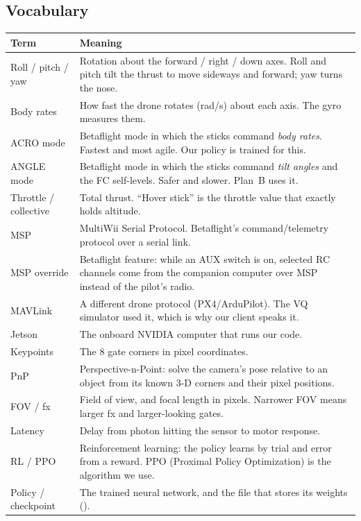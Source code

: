 \documentclass[10pt,a4paper]{article}
\newcommand{\code}[1]{\texttt{\detokenize{#1}}}
\begin{document}
\subsection{Vocabulary}
\begin{longtable}{@{}p{3.3cm}p{12.3cm}@{}}
\toprule
Term & Meaning \\
\midrule\endhead
Roll / pitch / yaw & Rotation about the forward / right / down axes. Roll and pitch tilt the thrust to move sideways and forward; yaw turns the nose. \\
Body rates & How fast the drone rotates (rad/s) about each axis. The gyro measures them. \\
ACRO mode & Betaflight mode in which the sticks command \emph{body rates}. Fastest and most agile. Our policy is trained for this. \\
ANGLE mode & Betaflight mode in which the sticks command \emph{tilt angles} and the FC self-levels. Safer and slower. Plan~B uses it. \\
Throttle / collective & Total thrust. ``Hover stick'' is the throttle value that exactly holds altitude. \\
MSP & MultiWii Serial Protocol. Betaflight's command/telemetry protocol over a serial link. \\
MSP override & Betaflight feature: while an AUX switch is on, selected RC channels come from the companion computer over MSP instead of the pilot's radio. \\
MAVLink & A different drone protocol (PX4/ArduPilot). The VQ simulator used it, which is why our client speaks it. \\
Jetson & The onboard NVIDIA computer that runs our code. \\
Keypoints & The 8 gate corners in pixel coordinates. \\
PnP & Perspective-n-Point: solve the camera's pose relative to an object from its known 3-D corners and their pixel positions. \\
FOV / fx & Field of view, and focal length in pixels. Narrower FOV means larger fx and larger-looking gates. \\
Latency & Delay from photon hitting the sensor to motor response. \\
RL / PPO & Reinforcement learning: the policy learns by trial and error from a reward. PPO (Proximal Policy Optimization) is the algorithm we use. \\
Policy / checkpoint & The trained neural network, and the file that stores its weights (\code{.pt}). \\

\end{longtable}
\end{document}
